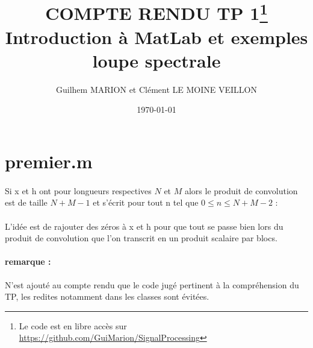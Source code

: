 \documentclass{article}
\title{COMPTE RENDU TP 1\footnote{Le code est en libre accès sur \url{https://github.com/GuiMarion/SignalProcessing}} \\ Introduction à MatLab et exemples loupe spectrale} %
\author{Guilhem \textsc{MARION} et Clément \textsc{LE MOINE VEILLON}} %
\date{\today} %
\begin{document}
\maketitle

\section{premier.m}



\paragraph{}
Si x et h ont pour longueurs respectives $N$ et $M$ alors le produit de convolution est de taille $N+M-1$ et s'écrit pour tout n tel que  $0 \leq n \leq N + M-2$ : 

\begin{center}\end{center}

\paragraph{}
L'idée est de rajouter des zéros à x et h pour que tout se passe bien lors du produit de convolution que l'on transcrit en un produit scalaire par blocs. 

\paragraph{remarque :}
N'est ajouté au compte rendu que le code jugé pertinent à la compréhension du TP, les redites notamment dans les classes sont évitées.
\end{document}
